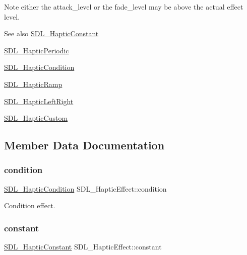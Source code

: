 Note either the attack\+\_\+level or the fade\+\_\+level may be above the actual effect level.

\begin{DoxySeeAlso}{See also}
\mbox{\hyperlink{struct_s_d_l___haptic_constant}{S\+D\+L\+\_\+\+Haptic\+Constant}} 

\mbox{\hyperlink{struct_s_d_l___haptic_periodic}{S\+D\+L\+\_\+\+Haptic\+Periodic}} 

\mbox{\hyperlink{struct_s_d_l___haptic_condition}{S\+D\+L\+\_\+\+Haptic\+Condition}} 

\mbox{\hyperlink{struct_s_d_l___haptic_ramp}{S\+D\+L\+\_\+\+Haptic\+Ramp}} 

\mbox{\hyperlink{struct_s_d_l___haptic_left_right}{S\+D\+L\+\_\+\+Haptic\+Left\+Right}} 

\mbox{\hyperlink{struct_s_d_l___haptic_custom}{S\+D\+L\+\_\+\+Haptic\+Custom}} 
\end{DoxySeeAlso}


\subsection{Member Data Documentation}
\mbox{\label{union_s_d_l___haptic_effect_aa8fdd1ba202ccd7e61f48ef9977080d2}} 
\subsubsection{\texorpdfstring{condition}{condition}}
{\footnotesize\ttfamily \mbox{\hyperlink{struct_s_d_l___haptic_condition}{S\+D\+L\+\_\+\+Haptic\+Condition}} S\+D\+L\+\_\+\+Haptic\+Effect\+::condition}

Condition effect. \mbox{\label{union_s_d_l___haptic_effect_ac435275e9683d6cc5d65b9c7cc2ec659}} 
\subsubsection{\texorpdfstring{constant}{constant}}
{\footnotesize\ttfamily \mbox{\hyperlink{struct_s_d_l___haptic_constant}{S\+D\+L\+\_\+\+Haptic\+Constant}} S\+D\+L\+\_\+\+Haptic\+Effect\+::constant}

